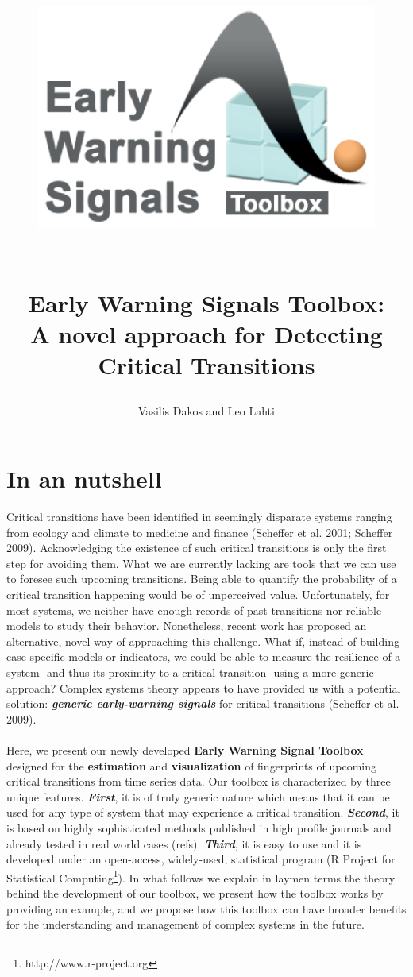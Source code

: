 \documentclass[12pt,a4paper,final]{article}
\author{Vasilis Dakos and Leo Lahti}
\title{
\begin{figure}[h]
\begin{left}
\includegraphics[scale=0.55]{logoEWS.eps}
\end{left}
\end{figure}
\\
Early Warning Signals Toolbox: 
\\ A novel approach for Detecting Critical Transitions
}
\begin{document}
\maketitle
\section{In an nutshell} %
Critical transitions have been identified in seemingly disparate systems ranging from ecology and climate to medicine and finance (Scheffer et al. 2001; Scheffer 2009). %
Acknowledging the existence of such critical transitions is only the first step for avoiding them. What we are currently lacking are tools that we can use to foresee such upcoming transitions. Being able to quantify the probability of a critical transition happening would be of unperceived value. Unfortunately, for most systems, we neither have enough records of past transitions nor reliable models to study their behavior. Nonetheless, recent work has proposed an alternative, novel way of approaching this challenge. What if, instead of building case-specific models or indicators, we could be able to measure the resilience of a system- and thus its proximity to a critical transition- using a more generic approach? Complex systems theory appears to have provided us with a potential solution: \textit{\textbf{generic early-warning signals}} for critical transitions (Scheffer et al. 2009). 
\\
\\
Here, we present our newly developed \textbf{Early Warning Signal Toolbox} designed for the \textbf{estimation} and \textbf{visualization} of fingerprints of upcoming critical transitions from time series data. Our toolbox is characterized by three unique features. \textit{\textbf{First}}, it is of truly generic nature which means that it can be used for any type of system that may experience a critical transition. \textit{\textbf{Second}}, it is based on highly sophisticated methods published in high profile journals and already tested in real world cases (refs). \textit{\textbf{Third}}, it is easy to use and it is developed under an open-access, widely-used, statistical program (R Project for Statistical Computing\footnote{http://www.r-project.org}). In what follows we explain in laymen terms the theory behind the development of our toolbox, we present how the toolbox works by providing an example, and we propose how this toolbox can have broader benefits for the understanding and management of complex systems in the future.  
\end{document}
